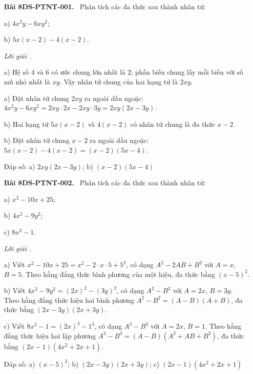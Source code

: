\documentclass[12pt,a4paper]{article}
\newenvironment{problem}[1][]{\par\medskip\noindent\textbf{Bài #1.}\ }{\par}
\newenvironment{solution}[1][]{\par\noindent\textit{Lời giải #1.}\par}{\par}
\begin{document}
\begin{problem}[8DS-PTNT-001]
Phân tích các đa thức sau thành nhân tử:

a) $4x^2y - 6xy^2$;

b) $5x(x - 2) - 4(x - 2)$.

\begin{solution}
a) Hệ số $4$ và $6$ có ước chung lớn nhất là $2$; phần biến chung lấy mỗi biến với số mũ nhỏ nhất là $xy$. Vậy nhân tử chung của hai hạng tử là $2xy$.

a) Đặt nhân tử chung $2xy$ ra ngoài dấu ngoặc: $4x^2y - 6xy^2 = 2xy \cdot 2x - 2xy \cdot 3y = 2xy(2x - 3y)$.

b) Hai hạng tử $5x(x - 2)$ và $4(x - 2)$ có nhân tử chung là đa thức $x - 2$.

b) Đặt nhân tử chung $x - 2$ ra ngoài dấu ngoặc: $5x(x - 2) - 4(x - 2) = (x - 2)(5x - 4)$.

Đáp số: a) $\boxed{2xy(2x - 3y)}$; b) $\boxed{(x - 2)(5x - 4)}$
\end{solution}
\end{problem}

\begin{problem}[8DS-PTNT-002]
Phân tích các đa thức sau thành nhân tử:

a) $x^2 - 10x + 25$;

b) $4x^2 - 9y^2$;

c) $8x^3 - 1$.

\begin{solution}
a) Viết $x^2 - 10x + 25 = x^2 - 2 \cdot x \cdot 5 + 5^2$, có dạng $A^2 - 2AB + B^2$ với $A = x$, $B = 5$. Theo hằng đẳng thức bình phương của một hiệu, đa thức bằng $(x - 5)^2$.

b) Viết $4x^2 - 9y^2 = (2x)^2 - (3y)^2$, có dạng $A^2 - B^2$ với $A = 2x$, $B = 3y$. Theo hằng đẳng thức hiệu hai bình phương $A^2 - B^2 = (A - B)(A + B)$, đa thức bằng $(2x - 3y)(2x + 3y)$.

c) Viết $8x^3 - 1 = (2x)^3 - 1^3$, có dạng $A^3 - B^3$ với $A = 2x$, $B = 1$. Theo hằng đẳng thức hiệu hai lập phương $A^3 - B^3 = (A - B)(A^2 + AB + B^2)$, đa thức bằng $(2x - 1)(4x^2 + 2x + 1)$.

Đáp số: a) $\boxed{(x - 5)^2}$; b) $\boxed{(2x - 3y)(2x + 3y)}$; c) $\boxed{(2x - 1)(4x^2 + 2x + 1)}$
\end{solution}
\end{problem}
\end{document}
